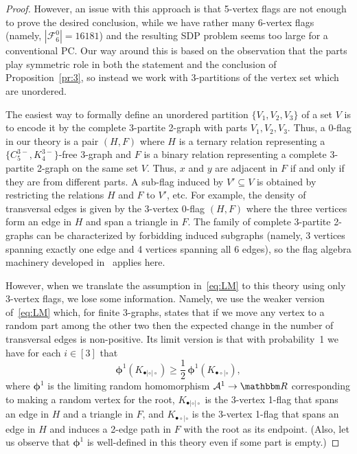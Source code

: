 \documentclass[11pt,a4paper]{article}
\theoremstyle{remark}
\newcommand{\C}[1]{\mathcal{#1}}
\newcommand{\I}[1]{{\mathbbm #1}}
\begin{document}
\begin{proof}
However, an issue with this approach is that 5-vertex flags are not enough to prove the desired conclusion, while we have rather many 6-vertex flags (namely, $|\C F_6^0|=16181$) and the resulting SDP problem seems too large for a conventional PC. Our way around this is based on the observation that the parts play symmetric role in both the statement and the conclusion of Proposition~\ref{pr:3}, so instead we work with 3-partitions of the vertex set which are unordered. 

The easiest way to formally define an unordered partition $\{V_1,V_2,V_3\}$ of a set $V$ is to encode it by the complete 3-partite 2-graph with parts $V_1,V_2,V_3$. Thus, a 0-flag in our theory is a pair $(H,F)$ where $H$ is a ternary relation representing a $\{C_{5}^{3-},K_{4}^{3-}\}$-free $3$-graph and $F$ is a binary relation representing a complete 3-partite 2-graph on the same set $V$. Thus, $x$ and $y$ are adjacent in $F$ if and only if they are from different parts.
A sub-flag induced by $V'\subseteq V$ is obtained by restricting the relations $H$ and $F$ to $V'$, etc. For example, the density of transversal edges is given by the 3-vertex 0-flag $(H,F)$ where the three vertices form an edge in $H$ and span a triangle in $F$.  The family of complete 3-partite 2-graphs can be characterized by forbidding induced subgraphs (namely, 3 vertices spanning exactly one edge and 4 vertices spanning all 6 edges), so the flag algebra machinery developed in~\cite{Raz07} applies here.

However, when we translate the assumption in~\eqref{eq:LM} to this theory using only 3-vertex flags, we lose some information. Namely, we use the  weaker version of~\eqref{eq:LM} which, for finite 3-graphs, states that if we move any vertex to a random part among the other two then the expected change in the number of transversal edges is non-positive. Its limit version is that with probability~1 we have for each $i\in [3]$ that 
\begin{equation}\label{eq:LMSymm}
 \boldsymbol{\phi}^{1}(K_{\bullet|\circ|\circ}) \ge \frac12\,  \boldsymbol{\phi}^{1}(K_{\bullet\circ|\circ}),
\end{equation}
 where $\boldsymbol{\phi}^{1}$ is the limiting random homomorphism $\C A^1\to\I R$ corresponding to making a random vertex for the root, $K_{\bullet|\circ|\circ}$ is the 3-vertex 1-flag that spans an edge in $H$ and a triangle in $F$, and $K_{\bullet\circ|\circ}$ is  the 3-vertex 1-flag that spans an edge in $H$ and induces a 2-edge path in $F$ with the root as its endpoint. (Also, let us observe that $\boldsymbol{\phi}^{1}$ is well-defined in this theory even if some part is empty.) 
 

\end{proof}
\end{document}
